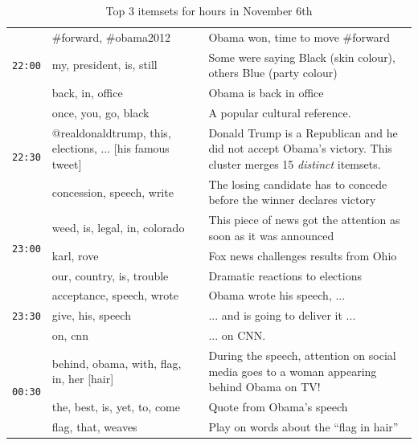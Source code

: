 \documentclass{sig-alternate}
\begin{document}
\begin{table}
\begin{center}
\begin{tabular}{|p{.6cm}|p{2.5cm}|p{5cm}|}
\multirow{3}{*}{\texttt{22:00}} 	& \#forward, \#obama2012		&  Obama won, time to move \#forward \\ \cline{2-3}
					   	& my, president, is, still		& Some were saying Black (skin colour), others Blue (party colour) \\ \cline{2-3}
						& back, in, office		&   Obama is back in office\\\hline

\multirow{3}{*}{\texttt{22:30}} 	& once, you, go, black		& A popular cultural reference.\\ \cline{2-3} %
					   	& @realdonaldtrump, this, elections, ... [his famous tweet] 		& Donald Trump is a Republican and he did not accept Obama's victory. This cluster merges 15 \emph{distinct} itemsets.\\ \cline{2-3}
						& concession, speech, write		&   The losing candidate has to concede before the winner declares victory \\\hline
						
\multirow{3}{*}{\texttt{23:00}} 	& weed, is, legal, in, colorado		&  This piece of news got the attention as soon as it was announced  \\ \cline{2-3}
					   	& karl, rove		& Fox news challenges results from Ohio\\ \cline{2-3}
						& our, country, is, trouble		&   Dramatic reactions to elections \\\hline						
\multirow{3}{*}{\texttt{23:30}} 	& acceptance, speech, wrote		&  Obama wrote his speech, ...\\ \cline{2-3}
					   	& give, his, speech		& ... and is going to deliver it ... \\ \cline{2-3}
						& on, cnn		&   ... on CNN. \\\hline	
						
\multirow{3}{*}{\texttt{00:30}} 	& behind, obama, with, flag, in, her [hair]		&  During the speech, attention on social media goes to a woman appearing behind Obama on TV! \\ \cline{2-3}
					   	& the, best, is, yet, to, come		&  Quote from Obama's speech\\ \cline{2-3}
						& flag, that, weaves	& Play on words about the ``flag in hair'' \\\hline																			
\end{tabular}
\end{center}
\caption{Top 3 itemsets for hours in November 6th}
 \label{table:nov6}
\end{table}
\end{document}
